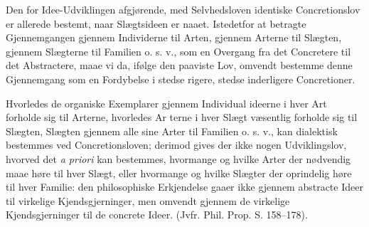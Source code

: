 \documentclass[11pt]{book}
\newcommand{\opage}[1]{\marginnote{\footnotesize\textit{[#1]}}}
\begin{document}
Den for Idee-Udviklingen afgjørende, med Selvhedsloven identiske
Concretionslov er allerede bestemt, naar Slægtsideen er naaet.
Istedetfor at betragte Gjennemgangen gjennem Individerne til Arten,
gjennem Arterne til Slægten, gjennem Slægterne til Familien o. s. v.,
som en Overgang fra det Concretere til det Abstractere, maae vi da,
ifølge den paaviste Lov, omvendt bestemme denne Gjennemgang som en
Fordybelse i stedse rigere, stedse inderligere Concretioner.

Hvorledes de organiske Exemplarer gjennem Individual\-%
ideerne i hver Art forholde sig til Arterne, hvorledes Ar\-%
terne i hver Slægt væsentlig forholde sig til Slægten, Slægten
\opage{326} \setcounter{footnote}{0}%
gjennem alle sine Arter til Familien o. s. v., kan dialektisk bestemmes
ved Concretionsloven; derimod gives der ikke nogen Udviklingslov,
hvorved det \textit{a priori} kan bestemmes, hvormange og hvilke Arter
der nødvendig maae høre til hver Slægt, eller hvormange og hvilke
Slægter der oprindelig høre til hver Familie: den philosophiske
Erkjendelse gaaer ikke gjennem abstracte Ideer til virkelige
Kjendsgjerninger, men omvendt gjennem de virkelige Kjendsgjerninger
til de concrete Ideer. (Jvfr. Phil. Prop. S. 158--178).
\end{document}
